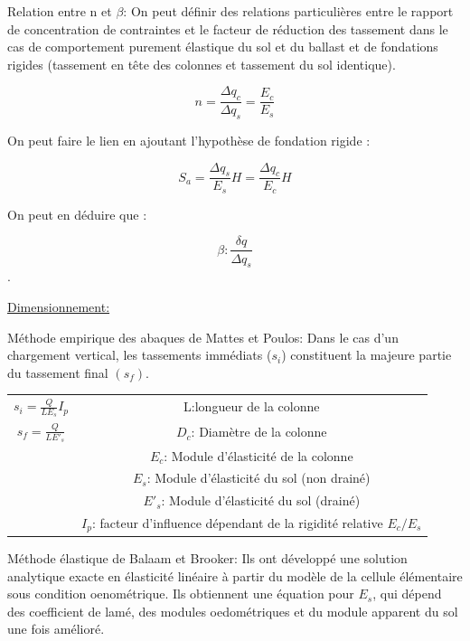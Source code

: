 \medskip

Relation entre n et $\beta$: On peut définir des relations particulières entre le rapport de concentration de contraintes et le facteur de réduction des tassement dans le cas de comportement purement élastique du sol et du ballast et de fondations rigides (tassement en tête des colonnes et tassement du sol identique).

$$ n = \frac{\Delta q_c}{\Delta q_s} = \frac{E_c}{E_s}$$ 

On peut faire le lien en ajoutant l'hypothèse de fondation rigide : 

$$ S_a = \frac{\Delta q_s}{E_s} H = \frac{\Delta q_c}{E_c} H$$ 

On peut en déduire que : 

$$ \beta : \frac{\delta q}{\Delta q_s}$$.

\medskip

\underline{Dimensionnement:}

Méthode empirique des abaques de Mattes et Poulos: Dans le cas d'un chargement vertical, les tassements immédiats ($s_i$) constituent la majeure partie du tassement final $(s_f)$. 

\begin{center}
\begin{tabular}{c|c}
    $s_i=\frac{Q}{L E_s}I_p$    & L:longueur de la colonne  \\
    $s_f = \frac{Q}{L E'_s}$    & $D_c$: Diamètre de la colonne \\
                                  & $E_c$: Module d'élasticité de la colonne \\
                                  & $E_s$: Module d'élasticité du sol (non drainé) \\
                                  & $E'_s$: Module d'élasticité du sol (drainé) \\
                                  & $I_p$: facteur d'influence dépendant de la rigidité relative $E_c/E_s$
\end{tabular}
\end{center}

\medskip

Méthode élastique de Balaam et Brooker: Ils ont développé une solution analytique exacte en élasticité linéaire à partir du modèle de la cellule élémentaire sous condition oenométrique. Ils obtiennent une équation pour $E_s$, qui dépend des coefficient de lamé, des modules oedométriques et du module apparent du sol une fois amélioré.

\medskip

